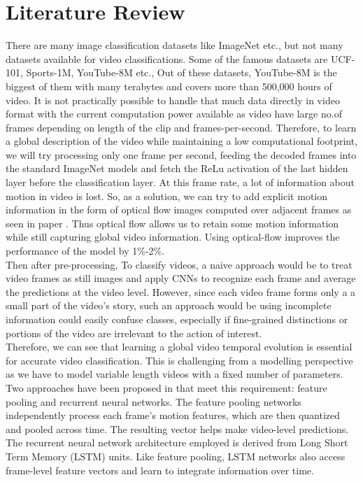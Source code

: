 \documentclass[10pt,twocolumn,letterpaper]{article}
\begin{document}

\section{Literature Review}
\label{sec:literature}
There are many image classification datasets like ImageNet etc., but not many datasets available for video classifications. Some of the famous datasets are UCF-101, Sports-1M, YouTube-8M etc., Out of these datasets, YouTube-8M is the biggest of them with many terabytes and covers more than 500,000 hours of video. It is not practically possible to handle that much data directly in video format with the current computation power available as video have large no.of frames depending on length of the clip and frames-per-second. Therefore, to learn a global description of the video \cite{abuelhaija2016youtube8m} while maintaining a low computational footprint, we will try processing only one frame per second, feeding the decoded frames into the standard ImageNet models and fetch the ReLu activation of the last hidden layer before the classification layer. At this frame rate, a lot of information about motion in video is lost. So, as a solution, we can try to add explicit motion information in the form of optical flow images computed over adjacent frames as seen in paper \cite{ng2015short}. Thus optical flow allows us to retain some motion information while still capturing global video information. Using optical-flow improves the performance of the model by 1\%-2\%.\\

Then after pre-processing, To classify videos, a naive approach would be to treat video frames as still images and apply CNNs to recognize each frame and average the predictions at the video level. However, since each video frame forms only a a small part of the video’s story, such an approach would be using incomplete information could easily confuse classes, especially if fine-grained distinctions or portions of the video are irrelevant to the action of interest.\\

Therefore, we can see that learning a global video temporal evolution is essential for accurate video classification. This is challenging from a modelling perspective as we have to model variable length videos with a fixed number of parameters. Two approaches have been proposed in \cite{ng2015short} that meet this requirement: feature pooling and recurrent neural networks. The feature pooling networks independently process each frame's motion features, which are then quantized and pooled across time. The resulting vector helps make video-level predictions. The recurrent neural network architecture employed is derived from Long Short Term Memory (LSTM) units. Like feature pooling, LSTM networks also access frame-level feature vectors and learn to integrate information over time. 
\end{document}

